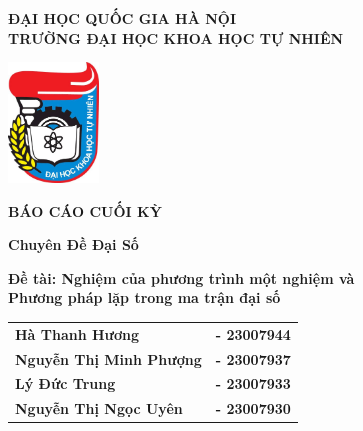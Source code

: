 \thispagestyle{empty}



\begin{center}
  \vspace{1.2cm}
  \textbf{ĐẠI HỌC QUỐC GIA HÀ NỘI} \\[0.2cm]
  \textbf{\fontsize{14pt}{17pt}\selectfont TRƯỜNG ĐẠI HỌC KHOA HỌC TỰ NHIÊN}

  \vspace{1.2cm}
  \includegraphics[width=0.18\textwidth]{figures/hus_logo.jpg}

  \vspace{1.2cm}
  {\bfseries\fontsize{35pt}{33pt}\selectfont BÁO CÁO CUỐI KỲ}

  \vspace{0.5cm}
  {\bfseries\fontsize{22pt}{26pt}\selectfont Chuyên Đề Đại Số}

  \vspace{0.8cm}
  \parbox{\dimexpr\textwidth - 1.2cm\relax}{
    \centering
    \textbf{\fontsize{18pt}{25pt}\selectfont
      Đề tài: Nghiệm của phương trình một nghiệm và\\
      Phương pháp lặp trong ma trận đại số}
  }

  \vspace{1.6cm}
  \renewcommand{\arraystretch}{1.2}
  \begin{tabular}{@{}l l@{}}
    \textbf{\fontsize{14pt}{17pt}Hà Thanh Hương}         & \textbf{\fontsize{14pt}{17pt}- 23007944} \\[-0.2em]
    \textbf{\fontsize{14pt}{17pt}Nguyễn Thị Minh Phượng} & \textbf{\fontsize{14pt}{17pt}- 23007937} \\[-0.2em]
    \textbf{\fontsize{14pt}{17pt}Lý Đức Trung}           & \textbf{\fontsize{14pt}{17pt}- 23007933} \\[-0.2em]
    \textbf{\fontsize{14pt}{17pt}Nguyễn Thị Ngọc Uyên}   & \textbf{\fontsize{14pt}{17pt}- 23007930}
  \end{tabular}
  \renewcommand{\arraystretch}{1}


\end{center}
